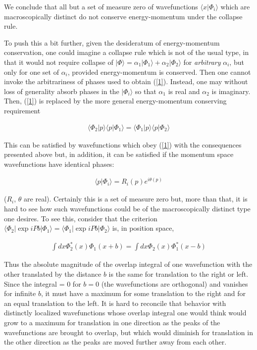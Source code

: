 \documentclass[12pt]{article}
\begin{document}
	We conclude that all but a set of measure zero of 
wavefunctions $\langle x|\Phi_{i }\rangle$ which are macroscopically distinct 
do not conserve energy-momentum under the collapse rule. 

	To push this a bit further, given the desideratum of energy-momentum conservation, one could imagine 
a collapse rule which is not of the usual type, in that it would not require collapse of 
$|\Phi\rangle=\alpha_{1}|\Phi_{1}\rangle +\alpha_{2}|\Phi_{2}\rangle$ for {\it arbitrary} $\alpha_{i}$, but
 only for one set of $\alpha_{i}$, provided energy-momentum is conserved.  Then one cannot invoke the 
 arbitrariness of phases used to obtain (\ref{1}).  Instead, one may without loss of generality absorb phases 
 in the $|\Phi_{i}\rangle$ so that $\alpha_{1}$ is real and $\alpha_{2}$ is imaginary.  Then, (\ref{1}) is 
 replaced by the more general energy-momentum conserving requirement
 
\begin{eqnarray*}
 \langle \Phi_{2}|p\rangle\langle p|\Phi_{1}\rangle =\langle \Phi_{1}|p\rangle\langle p|\Phi_{2}\rangle 
\end{eqnarray*}

\noindent This can be satisfied by wavefunctions which obey (\ref{1}) with the consequences presented above  
but, in addition, it can be satisfied if the momentum space wavefunctions have identical phases: 

 \begin{eqnarray*}
\langle p|\Phi_{i}\rangle = R_{i}(p)e^{i\theta (p)}
\end{eqnarray*}

\noindent ($R_{i}$, $\theta$  are real).  Certainly this is a set of measure zero but,  
more than that, it is hard to see how such wavefunctions could be of the macroscopically distinct type 
one desires.  To see this, consider that the criterion $\langle \Phi_{2}|\exp iPb|\Phi_{1}\rangle=
\langle \Phi_{1}|\exp iPb|\Phi_{2}\rangle$ is, in position space, 

\begin{eqnarray*}
\int dx\Phi_{2}^{*}(x) \Phi_{1}(x+b) = \int dx\Phi_{2}(x) \Phi_{1}^{*}(x-b)
\end{eqnarray*}

\noindent Thus the absolute magnitude of the overlap integral of one wavefunction with 
the other translated by the distance $b$ is the same for translation to the right or left.  
Since the integral = 0 for $b=0$ (the wavefunctions are orthogonal) 
and vanishes for infinite $b$, it must have a maximum 
for some translation to the right and for an equal translation to the left.  It is hard to reconcile that 
behavior with distinctly localized wavefunctions whose overlap integral one would think would grow to 
a maximum for translation in one direction as the peaks of the wavefunctions are brought to overlap, 
but which would diminish for translation in the other direction 
as the peaks are moved further away from each other. 
\end{document}

